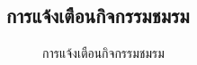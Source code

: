 \documentclass[14pt,oneside,openright,a4paper]{cpe-thai-project}
\begin{document}
\newpage

\subsection{การแจ้งเตือนกิจกรรมชมรม}

  \begin{figure}[!h]\centering
    \setlength{\fboxrule}{0.5mm} %
    \setlength{\fboxsep}{0.5cm}
    \caption{การแจ้งเตือนกิจกรรมชมรม}\label{fig:Notification about event from club}
  \end{figure}
\end{document}
